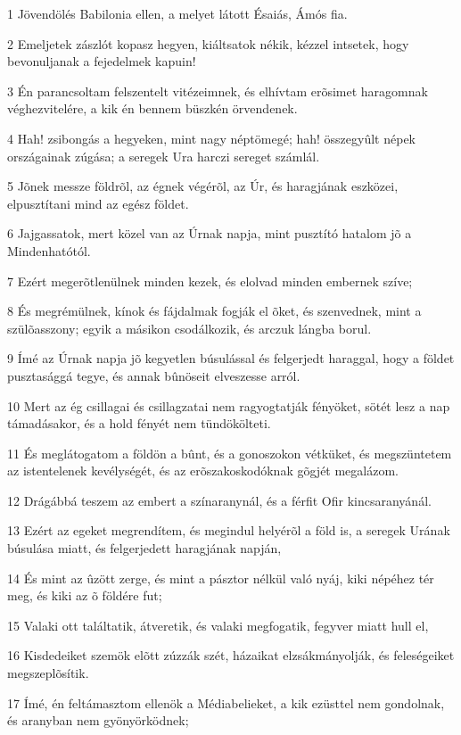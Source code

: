\par 1 Jövendölés Babilonia ellen, a melyet látott Ésaiás, Ámós fia.
\par 2 Emeljetek zászlót kopasz hegyen, kiáltsatok nékik, kézzel intsetek, hogy bevonuljanak a fejedelmek kapuin!
\par 3 Én parancsoltam felszentelt vitézeimnek, és elhívtam erõsimet haragomnak véghezvitelére, a kik én bennem büszkén örvendenek.
\par 4 Hah! zsibongás a hegyeken, mint nagy néptömegé; hah! összegyûlt népek országainak zúgása; a seregek Ura harczi sereget számlál.
\par 5 Jõnek messze földrõl, az égnek végérõl, az Úr, és haragjának eszközei, elpusztítani mind az egész földet.
\par 6 Jajgassatok, mert közel van az Úrnak napja, mint pusztító hatalom jõ a Mindenhatótól.
\par 7 Ezért megerõtlenülnek minden kezek, és elolvad minden embernek szíve;
\par 8 És megrémülnek, kínok és fájdalmak fogják el õket, és szenvednek, mint a szülõasszony; egyik a másikon csodálkozik, és arczuk lángba borul.
\par 9 Ímé az Úrnak napja jõ kegyetlen búsulással és felgerjedt haraggal, hogy a földet pusztasággá tegye, és annak bûnöseit elveszesse arról.
\par 10 Mert az ég csillagai és csillagzatai nem ragyogtatják fényöket, sötét lesz a nap támadásakor, és a hold fényét nem tündökölteti.
\par 11 És meglátogatom a földön a bûnt, és a gonoszokon vétküket, és megszüntetem az istentelenek kevélységét, és az erõszakoskodóknak gõgjét megalázom.
\par 12 Drágábbá teszem az embert a színaranynál, és a férfit Ofir kincsaranyánál.
\par 13 Ezért az egeket megrendítem, és megindul helyérõl a föld is, a seregek Urának búsulása miatt, és felgerjedett haragjának napján,
\par 14 És mint az ûzött zerge, és mint a pásztor nélkül való nyáj, kiki népéhez tér meg, és kiki az õ földére fut;
\par 15 Valaki ott találtatik, átveretik, és valaki megfogatik, fegyver miatt hull el,
\par 16 Kisdedeiket szemök elõtt zúzzák szét, házaikat elzsákmányolják, és feleségeiket megszeplõsítik.
\par 17 Ímé, én feltámasztom ellenök a Médiabelieket, a kik ezüsttel nem gondolnak, és aranyban nem gyönyörködnek;
